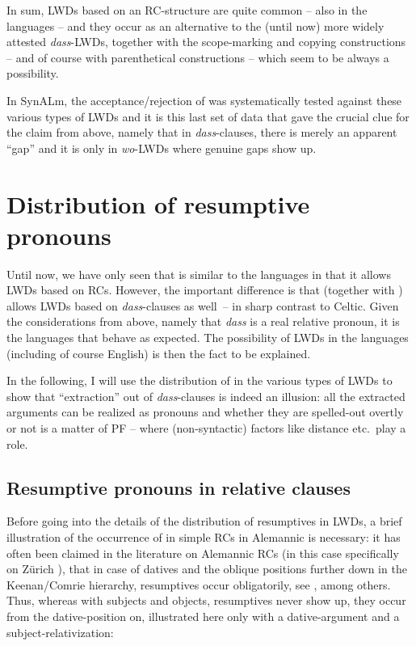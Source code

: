 \documentclass[output=paper]{langsci/langscibook}
\begin{document}
In sum, \glspl{LWD} based on an RC-structure are quite common -- also in the 
languages -- and they occur as an alternative to the (until now) more widely
attested \emph{dass}-\glspl{LWD}, together with the scope-marking and copying
constructions -- and of course with parenthetical constructions -- which seem to
be always a possibility.

In SynALm, the acceptance/rejection of  was systematically
tested against these various types of \glspl{LWD} and it is this last set of data that
gave the crucial clue for the claim from above, namely that in
\emph{dass}-clauses, there is merely an apparent \enquote{gap} and it is only in
\emph{wo}-\glspl{LWD} where genuine gaps show up.

\section{Distribution of resumptive pronouns} %

Until now, we have only seen that  is similar to the  languages
in that it allows \glspl{LWD} based on \glspl{RC}. However, the important
difference is that  (together with ) allows \glspl{LWD} based
on \emph{dass}-clauses as well~-- in sharp contrast to Celtic.  Given the
considerations from above, namely that \emph{dass} is a real relative pronoun,
it is the  languages that behave as expected. The possibility of
\glspl{LWD} in the  languages (including of course English) is then the
fact to be explained.

In the following, I will use the distribution of  in the
various types of \glspl{LWD} to show that \enquote{extraction} out of \emph{dass}-clauses is
indeed an illusion: all the extracted arguments can be realized as pronouns and
whether they are spelled-out overtly or not is a matter of \gls{PF} -- where
(non-syntactic) factors like distance etc.\ play a role.

\subsection{Resumptive pronouns in  relative clauses} %

Before going into the details of the distribution of resumptives in \glspl{LWD}, a
brief illustration of the occurrence of  in simple \glspl{RC} in
Alemannic is necessary: it has often been claimed in the literature on
Alemannic \glspl{RC} (in this case specifically on Zürich ), that in case of
datives and the oblique positions further down in the Keenan/Comrie hierarchy,
resumptives occur obligatorily, see \citet{vanRiemsdijk2003},
\citet{Salzmann2006} among others. Thus, whereas with subjects and objects,
resumptives never show up, they occur from the dative-position on, illustrated
here only with a dative-argument and a subject-rela\-ti\-vi\-za\-tion:
\end{document}
